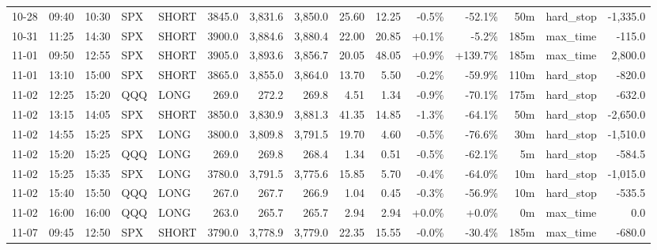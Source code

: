 \documentclass[11pt,a4paper,twoside]{article}
\begin{document}
\begin{landscape}
\begin{center}
\begin{longtable}{>{\color{txtmain}}l l l l l r r r r r r r r >{\color{txtmain}}l r}
10-28 & 09:40 & 10:30 & SPX & SHORT & 3845.0 & 3,831.6 & 3,850.0 & 25.60 & 12.25 & \textcolor{lossred}{-0.5\%} & \textcolor{lossred}{-52.1\%} & 50m & hard\_stop & \textcolor{lossred}{-1,335.0} \\
10-31 & 11:25 & 14:30 & SPX & SHORT & 3900.0 & 3,884.6 & 3,880.4 & 22.00 & 20.85 & \textcolor{wingreen}{+0.1\%} & \textcolor{lossred}{-5.2\%} & 185m & max\_time & \textcolor{lossred}{-115.0} \\
11-01 & 09:50 & 12:55 & SPX & SHORT & 3905.0 & 3,893.6 & 3,856.7 & 20.05 & 48.05 & \textcolor{wingreen}{+0.9\%} & \textcolor{wingreen}{+139.7\%} & 185m & max\_time & \textcolor{wingreen}{2,800.0} \\
11-01 & 13:10 & 15:00 & SPX & SHORT & 3865.0 & 3,855.0 & 3,864.0 & 13.70 & 5.50 & \textcolor{lossred}{-0.2\%} & \textcolor{lossred}{-59.9\%} & 110m & hard\_stop & \textcolor{lossred}{-820.0} \\
11-02 & 12:25 & 15:20 & QQQ & LONG & 269.0 & 272.2 & 269.8 & 4.51 & 1.34 & \textcolor{lossred}{-0.9\%} & \textcolor{lossred}{-70.1\%} & 175m & hard\_stop & \textcolor{lossred}{-632.0} \\
11-02 & 13:15 & 14:05 & SPX & SHORT & 3850.0 & 3,830.9 & 3,881.3 & 41.35 & 14.85 & \textcolor{lossred}{-1.3\%} & \textcolor{lossred}{-64.1\%} & 50m & hard\_stop & \textcolor{lossred}{-2,650.0} \\
11-02 & 14:55 & 15:25 & SPX & LONG & 3800.0 & 3,809.8 & 3,791.5 & 19.70 & 4.60 & \textcolor{lossred}{-0.5\%} & \textcolor{lossred}{-76.6\%} & 30m & hard\_stop & \textcolor{lossred}{-1,510.0} \\
11-02 & 15:20 & 15:25 & QQQ & LONG & 269.0 & 269.8 & 268.4 & 1.34 & 0.51 & \textcolor{lossred}{-0.5\%} & \textcolor{lossred}{-62.1\%} & 5m & hard\_stop & \textcolor{lossred}{-584.5} \\
11-02 & 15:25 & 15:35 & SPX & LONG & 3780.0 & 3,791.5 & 3,775.6 & 15.85 & 5.70 & \textcolor{lossred}{-0.4\%} & \textcolor{lossred}{-64.0\%} & 10m & hard\_stop & \textcolor{lossred}{-1,015.0} \\
11-02 & 15:40 & 15:50 & QQQ & LONG & 267.0 & 267.7 & 266.9 & 1.04 & 0.45 & \textcolor{lossred}{-0.3\%} & \textcolor{lossred}{-56.9\%} & 10m & hard\_stop & \textcolor{lossred}{-535.5} \\
11-02 & 16:00 & 16:00 & QQQ & LONG & 263.0 & 265.7 & 265.7 & 2.94 & 2.94 & \textcolor{wingreen}{+0.0\%} & \textcolor{wingreen}{+0.0\%} & 0m & max\_time & \textcolor{wingreen}{0.0} \\
11-07 & 09:45 & 12:50 & SPX & SHORT & 3790.0 & 3,778.9 & 3,779.0 & 22.35 & 15.55 & \textcolor{lossred}{-0.0\%} & \textcolor{lossred}{-30.4\%} & 185m & max\_time & \textcolor{lossred}{-680.0} \\

\end{longtable}
\end{center}
\end{landscape}
\end{document}
